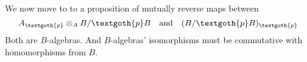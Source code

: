 \documentclass{article}
\begin{document}
We now move to to a proposition of mutually reverse maps between 
\[
A_\textgoth{p} \otimes_A B/\textgoth{p}B \quad  \text{and} \quad
(B/\textgoth{p}B)_\textgoth{p}
\]
Both are $B$-algebras. And $B$-algebras' isomorphisms must be commutative with homomorphisms from $B$.

\begin{figure}[htb]
\centering
\begin{subfigure}[T]{0.4\textwidth}
\centering
{}
\end{subfigure}
\centering
\begin{subfigure}[T]{0.4\textwidth}
\centering
{}
\end{subfigure}
\end{figure}
\end{document}
